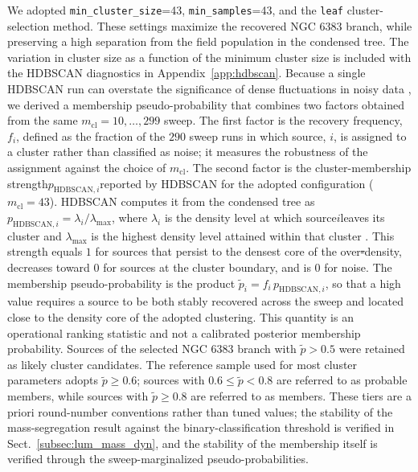 \documentclass{aa}
\providecommand{\DIFaddtex}[1]{{\protect\color{red}\uwave{#1}}} %
\providecommand{\DIFdeltex}[1]{{\protect\color{red}\sout{#1}}} %
\providecommand{\DIFaddbegin}{} %
\providecommand{\DIFaddend}{} %
\providecommand{\DIFdelbegin}{} %
\providecommand{\DIFdelend}{} %
\providecommand{\DIFadd}[1]{\texorpdfstring{\DIFaddtex{#1}}{#1}} %
\providecommand{\DIFdel}[1]{\texorpdfstring{\DIFdeltex{#1}}{}} %
\providecommand{\DIFscaledelfig}{0.5}
\newlength{\DIFdelgraphicswidth} %
\newlength{\DIFdelgraphicsheight} %
\providecommand{\DIFaddincludegraphics}[2][]{{\color{blue}\fbox{\DIFOincludegraphics[#1]{#2}}}} %
\providecommand{\DIFdelincludegraphics}[2][]{%
\sbox{\DIFdelgraphicsbox}{\DIFOincludegraphics[#1]{#2}}%
\settoboxwidth{\DIFdelgraphicswidth}{\DIFdelgraphicsbox} %
\settoboxtotalheight{\DIFdelgraphicsheight}{\DIFdelgraphicsbox} %
\scalebox{\DIFscaledelfig}{%
\parbox[b]{\DIFdelgraphicswidth}{\usebox{\DIFdelgraphicsbox}\\[-\baselineskip] \rule{\DIFdelgraphicswidth}{0em}}\llap{\resizebox{\DIFdelgraphicswidth}{\DIFdelgraphicsheight}{%
\setlength{\unitlength}{\DIFdelgraphicswidth}%
\begin{picture}(1,1)%
\thicklines\linethickness{2pt} %
{\color[rgb]{1,0,0}\put(0,0){\framebox(1,1){}}}%
{\color[rgb]{1,0,0}\put(0,0){\line( 1,1){1}}}%
{\color[rgb]{1,0,0}\put(0,1){\line(1,-1){1}}}%
\end{picture}%
}\hspace*{3pt}}} %
} %
\DeclareRobustCommand{\DIFaddbegin}{\DIFOaddbegin \let\includegraphics\DIFaddincludegraphics} %
\DeclareRobustCommand{\DIFaddend}{\DIFOaddend \let\includegraphics\DIFOincludegraphics} %
\DeclareRobustCommand{\DIFdelbegin}{\DIFOdelbegin \let\includegraphics\DIFdelincludegraphics} %
\DeclareRobustCommand{\DIFdelend}{\DIFOaddend \let\includegraphics\DIFOincludegraphics} %
\begin{document}
We adopted \texttt{min\_cluster\_size}=43, \texttt{min\_samples}=43, and the \texttt{leaf} cluster-selection method. These settings maximize the recovered NGC 6383 branch, while preserving a high separation from the field population in the condensed tree. The variation in cluster size as a function of the minimum cluster size is included with the HDBSCAN diagnostics in Appendix~\ref{app:hdbscan}. Because a single HDBSCAN run can overstate the significance of dense fluctuations in noisy data \citep{2021A&A...646A.104H}, we derived a membership pseudo-probability that combines two factors obtained from the same $m_{\mathrm{cl}}=10,\ldots,299$ sweep. The first factor is the recovery frequency, $f_i$, defined as the fraction of the $290$ sweep runs in which source, $i$, is assigned to a cluster rather than classified as noise; it measures the robustness of the assignment against the choice of $m_{\mathrm{cl}}$. The second factor is the cluster-membership strength\DIFaddbegin \DIFadd{, }\DIFaddend $p_{\mathrm{HDBSCAN},i}$\DIFaddbegin \DIFadd{, }\DIFaddend reported by HDBSCAN for the adopted configuration ($m_{\mathrm{cl}}=43$). HDBSCAN computes it from the condensed tree as $p_{\mathrm{HDBSCAN},i}=\lambda_i/\lambda_{\mathrm{max}}$, where $\lambda_i$ is the density level at which source\DIFaddbegin \DIFadd{, }\DIFaddend $i$\DIFaddbegin \DIFadd{, }\DIFaddend leaves its cluster and $\lambda_{\mathrm{max}}$ is the highest density level attained within that cluster \citep{McInnes2017}. This strength equals $1$ for sources that persist to the densest core of the over\DIFdelbegin \DIFdel{-}\DIFdelend density, decreases toward $0$ for sources at the cluster boundary, and is $0$ for noise. The membership pseudo-probability is the product $\tilde{p}_i=f_i\,p_{\mathrm{HDBSCAN},i}$, so that a high value requires a source to be both stably recovered across the sweep and located close to the density core of the adopted clustering. This quantity is an operational ranking statistic and not a calibrated posterior membership probability. Sources of the selected NGC 6383 branch with $\tilde{p}>0.5$ were retained as likely cluster candidates. The reference sample used for most cluster parameters adopts $\tilde{p}\geq0.6$; sources with $0.6\leq\tilde{p}<0.8$ are referred to as probable members, while sources with $\tilde{p}\geq0.8$ are referred to as members. These tiers are a priori round-number conventions rather than tuned values; the stability of the mass-segregation result against the binary-classification threshold is verified in Sect.~\ref{subsec:lum_mass_dyn}, and the stability of the membership itself is verified through the sweep-marginalized pseudo-probabilities.
\end{document}
